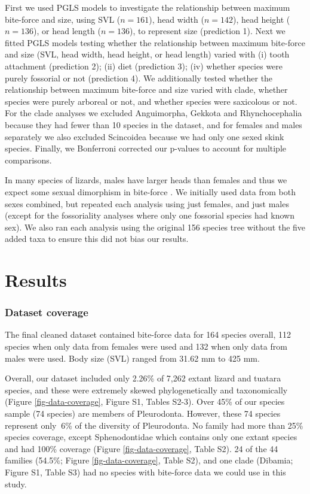 \documentclass[a4paper, 12pt]{article}
\begin{document}
First we used PGLS models to investigate the relationship between maximum bite-force and size, using SVL ($n = 161$), head width ($n = 142$), head height ($n = 136$), or head length ($n = 136$), to represent size (prediction 1). 
Next we fitted PGLS models testing whether the relationship between maximum bite-force and size (SVL, head width, head height, or head length) varied with (i) tooth attachment (prediction 2); (ii) diet (prediction 3);  (iv) whether species were purely fossorial or not (prediction 4).
We additionally tested whether the relationship between maximum bite-force and size varied with clade, whether species were purely arboreal or not, and whether species were saxicolous or not. 
For the clade analyses we excluded Anguimorpha, Gekkota and Rhynchocephalia because they had fewer than 10 species in the dataset, and for females and males separately we also excluded Scincoidea because we had only one sexed skink species. 
Finally, we Bonferroni corrected our p-values to account for multiple comparisons.

In many species of lizards, males have larger heads than females and thus we expect some sexual dimorphism in bite-force \cite{herrel1999sexual,verwaijen2002relationships}. 
We initially used data from both sexes combined, but repeated each analysis using just females, and just males (except for the fossoriality analyses where only one fossorial species had known sex). 
We also ran each analysis using the original 156 species tree without the five added taxa to ensure this did not bias our results. 


\section{Results}

\subsubsection{Dataset coverage}
The final cleaned dataset contained bite-force data for 164 species overall, 112 species when only data from females were used and 132 when only data from males were used. 
Body size (SVL) ranged from 31.62 mm to 425 mm.
 

Overall, our dataset included only 2.26\% of 7,262 extant lizard and tuatara species\cite{uetz2020reptile}, and these were extremely skewed phylogenetically and taxonomically (Figure \ref{fig-data-coverage}, Figure S1, Tables S2-3). 
Over 45\% of our species sample (74 species) are members of Pleurodonta. 
However, these 74 species represent only $~6$\% of the diversity of Pleurodonta. 
No family had more than 25\% species coverage, except Sphenodontidae which contains only one extant species and had 100\% coverage (Figure \ref{fig-data-coverage}, Table S2). 
24 of the 44 families (54.5\%; Figure \ref{fig-data-coverage}, Table S2), and one clade (Dibamia; Figure S1, Table S3) had no species with bite-force data we could use in this study. 
\end{document}
